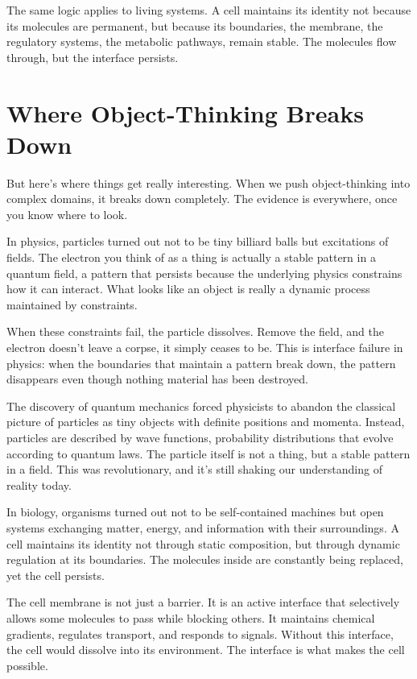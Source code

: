 \documentclass[
  openright]{book}
\begin{document}
The same logic applies to living systems. A cell maintains its identity
not because its molecules are permanent, but because its boundaries, the
membrane, the regulatory systems, the metabolic pathways, remain stable.
The molecules flow through, but the interface persists.

\section{Where Object-Thinking Breaks
Down}\label{where-object-thinking-breaks-down}

But here's where things get really interesting. When we push
object-thinking into complex domains, it breaks down completely. The
evidence is everywhere, once you know where to look.

In physics, particles turned out not to be tiny billiard balls but
excitations of fields. The electron you think of as a thing is actually
a stable pattern in a quantum field, a pattern that persists because the
underlying physics constrains how it can interact. What looks like an
object is really a dynamic process maintained by constraints.

When these constraints fail, the particle dissolves. Remove the field,
and the electron doesn't leave a corpse, it simply ceases to be. This is
interface failure in physics: when the boundaries that maintain a
pattern break down, the pattern disappears even though nothing material
has been destroyed.

The discovery of quantum mechanics forced physicists to abandon the
classical picture of particles as tiny objects with definite positions
and momenta. Instead, particles are described by wave functions,
probability distributions that evolve according to quantum laws. The
particle itself is not a thing, but a stable pattern in a field. This
was revolutionary, and it's still shaking our understanding of reality
today.

In biology, organisms turned out not to be self-contained machines but
open systems exchanging matter, energy, and information with their
surroundings. A cell maintains its identity not through static
composition, but through dynamic regulation at its boundaries. The
molecules inside are constantly being replaced, yet the cell persists.

The cell membrane is not just a barrier. It is an active interface that
selectively allows some molecules to pass while blocking others. It
maintains chemical gradients, regulates transport, and responds to
signals. Without this interface, the cell would dissolve into its
environment. The interface is what makes the cell possible.
\end{document}
